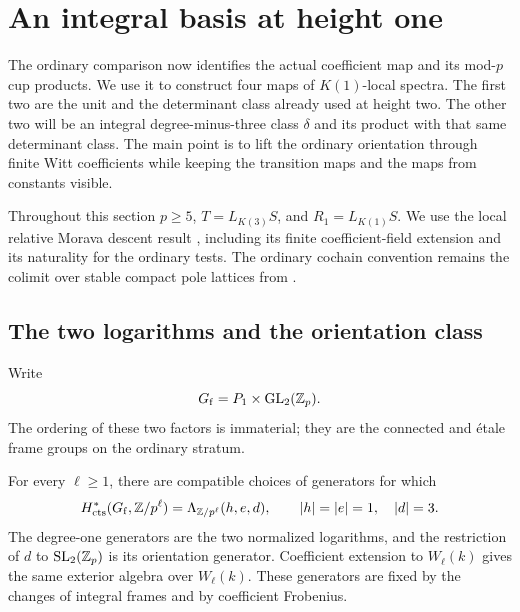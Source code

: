 \section{An integral basis at height one}\label{h3:sec:integral-basis}

The ordinary comparison now identifies the actual coefficient map and
its mod-\(p\) cup products.  We use it to construct four maps of
\(K(1)\)-local spectra.  The first two are the unit and the determinant
class already used at height two.  The other two will be an integral
degree-minus-three class \(\delta\) and its product with that same
determinant class.  The main point is to lift the ordinary orientation
through finite Witt coefficients while keeping the transition maps and
the maps from constants visible.

Throughout this section \(p\geq5\), \(T=L_{K(3)}S\), and
\(R_1=L_{K(1)}S\).  We use the local relative Morava descent result
, including its finite coefficient-field
extension and its naturality for the ordinary tests.  The ordinary
cochain convention remains the colimit over stable compact pole
lattices from .

\subsection{The two logarithms and the orientation class}

Write
\[
 G_{\mathrm f}=P_1\times\operatorname{GL}_2(\mathbb Z_p).
\]
The ordering of these two factors is immaterial; they are the
connected and étale frame groups on the ordinary stratum.

\begin{lemma}\label{h3:des:frame-cohomology}
For every \(\ell\geq1\), there are compatible choices of generators
for which
\[
 H^*_{\mathrm{cts}}(G_{\mathrm f},\mathbb Z/p^\ell)
       =\Lambda_{\mathbb Z/p^\ell}(h,e,d),
       \qquad |h|=|e|=1,\quad |d|=3.
\]
The degree-one generators are the two normalized logarithms,
and the restriction of \(d\) to \(\operatorname{SL}_2(\mathbb Z_p)\) is its orientation
generator.  Coefficient extension to \(W_\ell(k)\) gives the
same exterior algebra over \(W_\ell(k)\).  These generators are
fixed by the changes of integral frames and by coefficient
Frobenius.
\end{lemma}

